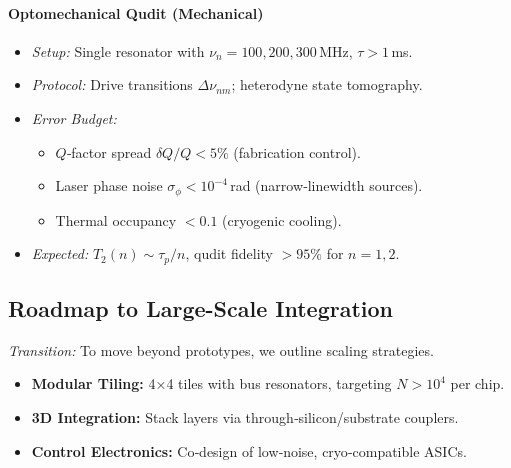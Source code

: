 \paragraph{Optomechanical Qudit (Mechanical)}
\begin{itemize}
  \item \emph{Setup:} Single resonator with $\nu_n=100,200,300\,$MHz, $\tau>1\,$ms.
  \item \emph{Protocol:} Drive transitions $\Delta\nu_{nm}$; heterodyne state tomography.
  \item \emph{Error Budget:}
    \begin{itemize}
      \item $Q$‐factor spread $\delta Q/Q<5\%$ (fabrication control).
      \item Laser phase noise $\sigma_\phi<10^{-4}\,$rad (narrow‐linewidth sources).
      \item Thermal occupancy $<0.1$ (cryogenic cooling).
    \end{itemize}
  \item \emph{Expected:} $T_2(n)\sim\tau_p/n$, qudit fidelity $>95\%$ for $n=1,2$.
\end{itemize}

\subsection{Roadmap to Large-Scale Integration}
\emph{Transition:} To move beyond prototypes, we outline scaling strategies.

\begin{itemize}
  \item \textbf{Modular Tiling:} 4×4 tiles with bus resonators, targeting $N>10^4$ per chip.
  \item \textbf{3D Integration:} Stack layers via through‐silicon/substrate couplers.
  \item \textbf{Control Electronics:} Co‐design of low‐noise, cryo‐compatible ASICs.
\end{itemize}

